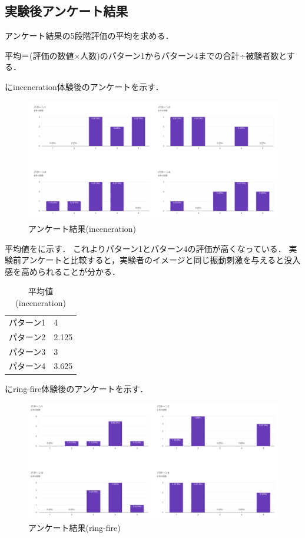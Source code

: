 \newpage

\subsection{実験後アンケート結果}
アンケート結果の5段階評価の平均を求める．

平均＝(評価の数値×人数)のパターン1からパターン4までの合計÷被験者数とする．

にinceneration体験後のアンケートを示す．

\begin{figure}[h]
  \centering
  \includegraphics[clip,width=14cm]{./fig/incenerationAnk.png}
  \caption{アンケート結果(inceneration)}\label{inceAnk}
  \end{figure}
  


平均値をに示す．
これよりパターン1とパターン4の評価が高くなっている．
実験前アンケートと比較すると，実験者のイメージと同じ振動刺激を与えると没入感を高められることが分かる．
\begin{table}[h]
    \caption{平均値(inceneration)}
    \centering
    \begin{tabular}{l|l}
    \hline
    \hline
    パターン1 & 4\\
    パターン2 & 2.125\\
    パターン3 & 3\\
    パターン4 & 3.625\\
    \hline
    \end{tabular}
    \label{tab;inceAvera}
\end{table}

にring-fire体験後のアンケートを示す．

\begin{figure}[h]
  \centering
  \includegraphics[clip,width=14cm]{fig/ringfireAnk.png}
  \caption{アンケート結果(ring-fire)}\label{ringAnk}
  \end{figure}


